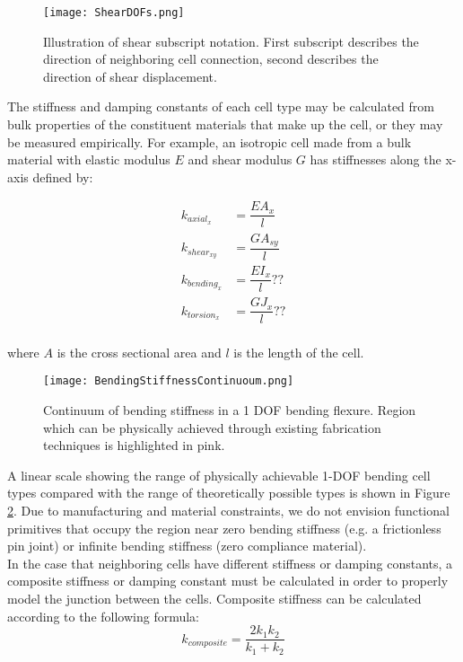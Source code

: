 {\begin{figure}
  \texttt{[image: ShearDOFs.png]}
  \caption{Illustration of shear subscript notation.  First subscript describes the direction of neighboring cell connection, second describes the direction of shear displacement.}
  \label{fig:ShearDOFs}
\end{figure}

The stiffness and damping constants of each cell type may be calculated from bulk properties of the constituent materials that make up the cell, or they may be measured empirically.  For example, an isotropic cell made from a bulk material with elastic modulus $E$ and shear modulus $G$ has stiffnesses along the x-axis defined by:

\begin{subequations}
\begin{align} 
\label{eq:kaxial}
k_{axial_x} &= \dfrac{EA_x}{l}\\[10pt]
\label{eq:kshear}
k_{shear_{xy}} &= \dfrac{GA_{sy}}{l}\\[10pt]
\label{eq:kbending}
k_{bending_x} &= \dfrac{EI_x}{l}??\\[10pt]
\label{eq:ktorsion}
k_{torsion_x} &= \dfrac{GJ_x}{l}??
\end{align}
\end{subequations}
\\
where $A$ is the cross sectional area and $l$ is the length of the cell.\\

 \begin{figure}
  \texttt{[image: BendingStiffnessContinuoum.png]}
  \caption{Continuum of bending stiffness in a 1 DOF bending flexure.  Region which can be physically achieved through existing fabrication techniques is highlighted in pink.}
  \label{fig:BendingStiffnessContinuoum}
\end{figure}

A linear scale showing the range of physically achievable 1-DOF bending cell types compared with the range of theoretically possible types is shown in Figure \ref{fig:BendingStiffnessContinuoum}.  Due to manufacturing and material constraints, we do not envision functional primitives that occupy the region near zero bending stiffness (e.g. a frictionless pin joint) or infinite bending stiffness (zero compliance material).\\

In the case that neighboring cells have different stiffness or damping constants, a composite stiffness or damping constant must be calculated in order to properly model the junction between the cells.  Composite stiffness can be calculated according to the following formula:
 \begin{equation} \label{eq:springseries}
 k_{composite} = \dfrac{2k_1k_2}{k_1+k_2}
 \end{equation}

}
